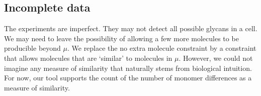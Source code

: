 \subsection{Incomplete data}

The experiments are imperfect. They may not detect all possible glycans
in a cell.
We may need to leave the possibility of allowing a few more molecules to be
producible beyond $\mu$.
We replace the no extra molecule constraint by a constraint that allows molecules
that are `similar' to molecules in $\mu$.
However, we could not imagine any measure of similarity that naturally stems from
biological intuition.
For now, our tool supports the count of the number of monomer differences
as a measure of similarity.



